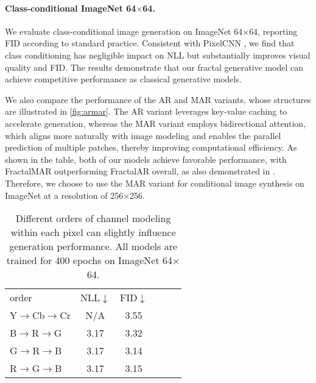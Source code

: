\paragraph{Class-conditional ImageNet 64$\times$64.} We evaluate class-conditional image generation on ImageNet 64$\times$64, reporting FID according to standard practice. Consistent with PixelCNN \citep{Oord2016}, we find that class conditioning has negligible impact on NLL but substantially improves visual quality and FID. The results demonstrate that our fractal generative model can achieve competitive performance as classical generative models.

We also compare the performance of the AR and MAR variants, whose structures are illustrated in \autoref{fig:armar}. The AR variant leverages key-value caching to accelerate generation, whereas the MAR variant employs bidirectional attention, which aligns more naturally with image modeling and enables the parallel prediction of multiple patches, thereby improving computational efficiency. As shown in the table, both of our models achieve favorable performance, with FractalMAR outperforming FractalAR overall, as also demonstrated in \cite{li2024autoregressive}. Therefore, we choose to use the MAR variant for conditional image synthesis on ImageNet at a resolution of 256$\times$256.

\begin{table}[h]
\begin{center}{
\vspace{-5pt}
\caption{
Different orders of channel modeling within each pixel can slightly influence generation performance. All models are trained for 400 epochs on ImageNet 64$\times$64.}
\label{tab:pixel}
\begin{tabular}{l | c c c c c}
order & NLL$\downarrow$ & FID$\downarrow$ \\
\shline
Y$\rightarrow$Cb$\rightarrow$Cr  &  N/A & 3.55 \\
B$\rightarrow$R$\rightarrow$G  & 3.17 & 3.32 \\
G$\rightarrow$R$\rightarrow$B  & 3.17 & 3.14 \\
R$\rightarrow$G$\rightarrow$B  & 3.17 & 3.15 \\
\end{tabular}
}
\end{center}
\end{table}

